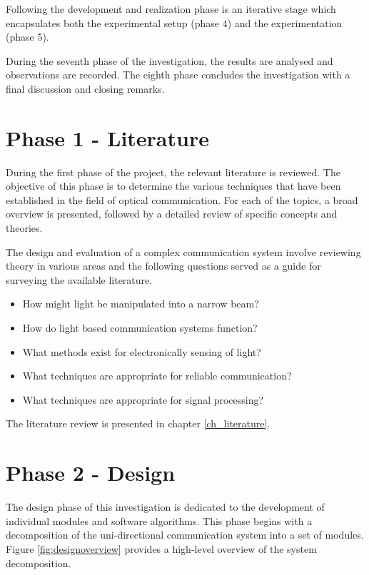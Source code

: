 Following the development and realization phase is an iterative stage which encapsulates both the experimental setup (phase 4) and the experimentation (phase 5).

During the seventh phase of the investigation, the results are analysed and observations are recorded. The eighth phase concludes the investigation with a final discussion and closing remarks.


\section{Phase 1 - Literature}

During the first phase of the project, the relevant literature is reviewed. The objective of this phase is to determine the various techniques that have been established in the field of optical communication. For each of the topics, a broad overview is presented, followed by a detailed review of specific concepts and theories.

The design and evaluation of a complex communication system involve reviewing theory in various areas and the following questions served as a guide for surveying the available literature.

\begin{itemize}
	\item How might light be manipulated into a narrow beam? %
	\item How do light based communication systems function? %
	\item What methods exist for electronically sensing of light? %
	\item What techniques are appropriate for reliable communication? %
	\item What techniques are appropriate for signal processing? %
\end{itemize}

The literature review is presented in chapter \ref{ch_literature}.


\section{Phase 2 - Design}

The design phase of this investigation is dedicated to the development of individual modules and software algorithms. This phase begins with a decomposition of the uni-directional communication system into a set of modules. Figure \ref{fig:designoverview} provides a high-level overview of the system decomposition.

